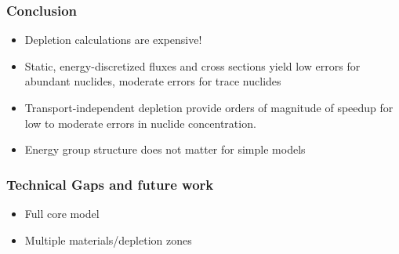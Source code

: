 \begin{frame}
  \frametitle{Conclusion}
        \begin{itemize}
                \item Depletion calculations are expensive!                
                \pause
                \item Static, energy-discretized fluxes and cross sections yield
                    low errors for abundant nuclides, moderate errors for trace
                    nuclides
                \pause
                \item Transport-independent depletion provide orders of
                    magnitude of speedup for low to moderate
                    errors in nuclide concentration.
                \pause
                \item Energy group structure does not matter for simple models
        \end{itemize}
\end{frame}

\begin{frame}
  \frametitle{Technical Gaps and future work}
        \begin{itemize}
                \item Full core model                
                \item Multiple materials/depletion zones
            \end{itemize}
\end{frame}
